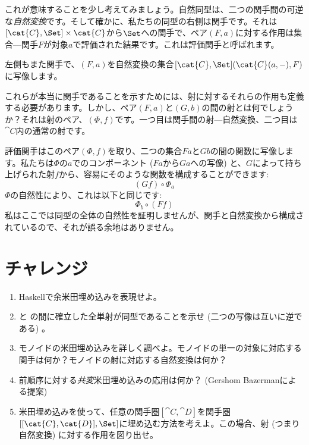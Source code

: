 これが意味することを少し考えてみましょう。自然同型は、二つの関手間の可逆な\emph{自然変換}です。そして確かに、私たちの同型の右側は関手です。それは$[\cat{C}, \Set] \times \cat{C}$から$\Set$への関手で、ペア$(F, a)$に対する作用は集合---関手$F$が対象$a$で評価された結果です。これは評価関手と呼ばれます。

左側もまた関手で、$(F, a)$を自然変換の集合$[\cat{C}, \Set](\cat{C}(a, -), F)$に写像します。

これらが本当に関手であることを示すためには、射に対するそれらの作用も定義する必要があります。しかし、ペア$(F, a)$と$(G, b)$の間の射とは何でしょうか？それは射のペア、$(\Phi, f)$です。一つ目は関手間の射---自然変換、二つ目は$\cat{C}$内の通常の射です。

評価関手はこのペア$(\Phi, f)$を取り、二つの集合$F a$と$G b$の間の関数に写像します。私たちは$\Phi$の$a$でのコンポーネント ($F a$から$G a$への写像) と、$G$によって持ち上げられた射$f$から、容易にそのような関数を構成することができます: 
\[(G f) \circ \Phi_a\]
$\Phi$の自然性により、これは以下と同じです: 
\[\Phi_b \circ (F f)\]
私はここでは同型の全体の自然性を証明しませんが、関手と自然変換から構成されているので、それが誤る余地はありません。

\section{チャレンジ}

\begin{enumerate}
  \tightlist
  \item
        Haskellで余米田埋め込みを表現せよ。
  \item
         と  の間に確立した全単射が同型であることを示せ (二つの写像は互いに逆である) 。
  \item
        モノイドの米田埋め込みを詳しく調べよ。モノイドの単一の対象に対応する関手は何か？モノイドの射に対応する自然変換は何か？
  \item
        前順序に対する\emph{共変}米田埋め込みの応用は何か？ (Gershom Bazermanによる提案) 
  \item
        米田埋め込みを使って、任意の関手圏$[\cat{C}, \cat{D}]$を関手圏$[[\cat{C}, \cat{D}], \Set]$に埋め込む方法を考えよ。この場合、射 (つまり自然変換) に対する作用を図り出せ。
\end{enumerate}
